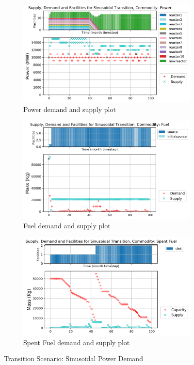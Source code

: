 \documentclass{anstrans}
\begin{document}
\begin{figure}[!htbp]
    \centering
    \begin{subfigure}[t]{\textwidth}
    \centering
        \includegraphics[width=0.8\linewidth]{figures/sinetransition-power.png} 
        \caption{Power demand and supply plot}
        \label{fig:sinetransition-power}
    \end{subfigure}
    \begin{subfigure}[t]{0.65\textwidth}
        \centering
        \includegraphics[width=\linewidth]{figures/sinetransition-fuel.png} 
        \caption{Fuel demand and supply plot}
	    \label{fig:sinetransition-fuel}
    \end{subfigure}
    \begin{subfigure}[t]{0.65\textwidth}
        \centering
        \includegraphics[width=\linewidth]{figures/sinetransition-spentfuel.png} 
        \caption{Spent Fuel demand and supply plot}
        \label{fig:sinetransition-spentfuel}
    \end{subfigure}
    \caption{Transition Scenario: Sinusoidal Power Demand}
\end{figure}
\end{document}
